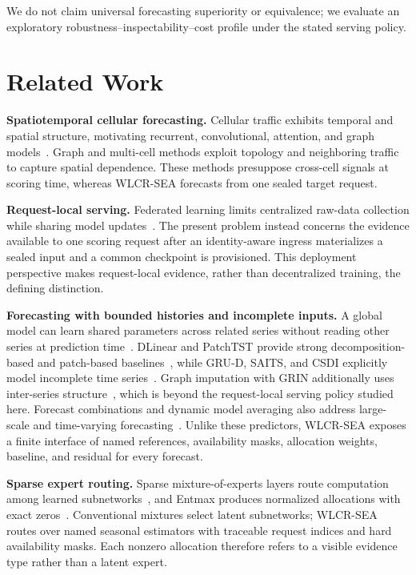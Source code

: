 \documentclass[10pt,conference,letterpaper]{IEEEtran}
\begin{document}
We do not claim universal forecasting superiority or equivalence; we evaluate an exploratory robustness--inspectability--cost profile under the stated serving policy.


\section{Related Work}
\textbf{Spatiotemporal cellular forecasting.}
Cellular traffic exhibits temporal and spatial structure, motivating recurrent, convolutional, attention, and graph models~\cite{huang2017study,zhang2018long,wang2019spatiotemporal,zhao2022aggregation,wang2022attention,yao2023mvstgn,mehrabian2023bernstein}. Graph and multi-cell methods exploit topology and neighboring traffic to capture spatial dependence. These methods presuppose cross-cell signals at scoring time, whereas WLCR-SEA forecasts from one sealed target request.

\textbf{Request-local serving.}
Federated learning limits centralized raw-data collection while sharing model updates~\cite{zhang2021dualattention}. The present problem instead concerns the evidence available to one scoring request after an identity-aware ingress materializes a sealed input and a common checkpoint is provisioned. This deployment perspective makes request-local evidence, rather than decentralized training, the defining distinction.

\textbf{Forecasting with bounded histories and incomplete inputs.}
A global model can learn shared parameters across related series without reading other series at prediction time~\cite{montero2021global}. DLinear and PatchTST provide strong decomposition-based and patch-based baselines~\cite{zeng2023dlinear,nie2023patchtst}, while GRU-D, SAITS, and CSDI explicitly model incomplete time series~\cite{che2018grud,du2023saits,tashiro2021csdi}. Graph imputation with GRIN additionally uses inter-series structure~\cite{cini2022grin}, which is beyond the request-local serving policy studied here. Forecast combinations and dynamic model averaging also address large-scale and time-varying forecasting~\cite{makridakis2022m5,koop2012forecasting}. Unlike these predictors, WLCR-SEA exposes a finite interface of named references, availability masks, allocation weights, baseline, and residual for every forecast.

\textbf{Sparse expert routing.}
Sparse mixture-of-experts layers route computation among learned subnetworks~\cite{shazeer2017moe}, and Entmax produces normalized allocations with exact zeros~\cite{peters2019sparse}. Conventional mixtures select latent subnetworks; WLCR-SEA routes over named seasonal estimators with traceable request indices and hard availability masks. Each nonzero allocation therefore refers to a visible evidence type rather than a latent expert.
\end{document}

